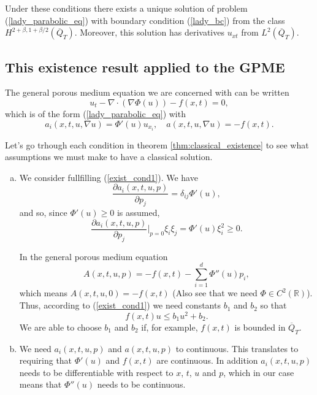 \documentclass[11pt, a4paper]{article}
\begin{document}
\begin{appendices}
\begin{theorem}
Under these conditions there exists a unique solution of problem (\ref{lady_parabolic_eq}) with boundary condition (\ref{lady_bc}) from the class $H^{2+\beta, 1+\beta/2}(\overline{Q}_T)$. Moreover, this solution has derivatives $u_{xt}$ from $L^2(\overline{Q}_T)$.
\end{theorem}
 
\subsection{This existence result applied to the GPME}
The general porous medium equation we are concerned with can be written
\begin{equation*}
u_t - \nabla \cdot (\nabla \Phi(u) ) - f(x,t) = 0,
\end{equation*}
which is of the form (\ref{lady_parabolic_eq}) with
\begin{equation}
a_i(x,t,u,\nabla u) = \Phi'(u) u_{x_i}, \quad a(x,t,u,\nabla u) = -f(x,t).
\end{equation}


Let's go trhough each condition in theorem \ref{thm:classical_existence} to see what assumptions we must make to have a classical solution.

\begin{enumerate}[a)]
	\item We consider fullfilling (\ref{exist_cond1}). We have
	\begin{equation*}
		\frac{\partial a_i(x,t,u,p)}{\partial p_j} = \delta_{ij} \Phi'(u),
	\end{equation*}
	and so, since $\Phi'(u) \geq 0$ is assumed,
	\begin{equation*}
		\frac{\partial a_i(x,t,u,p)}{\partial p_j}\Bigg|_{p=0}\xi_i\xi_j = \Phi'(u)\xi_i^2 \geq 0.
	\end{equation*}
	
	In the general porous medium equation
	\begin{equation*}
		A(x,t,u,p) = -f(x,t) - \sum_{i=1}^d \Phi''(u)p_i,
	\end{equation*}
	which means $A(x,t,u,0) = -f(x,t)$ (Also see that we need $\Phi \in C^2(\mathbb{R})$). Thus, according to (\ref{exist_cond1}) we need constants $b_1$ and $b_2$ so that
	\begin{equation*}
		f(x,t)u \leq b_1 u^2 + b_2.
	\end{equation*}
	We are able to choose $b_1$ and $b_2$ if, for example, $f(x,t)$ is bounded in $\overline{Q}_T$.
	
	\item We need $a_i(x,t,u,p)$ and $a(x,t,u,p)$ to continuous. This translates to requiring that $\Phi'(u)$ and $f(x,t)$ are continuous. In addition $a_i(x,t,u,p)$ needs to be differentiable with respect to $x$, $t$, $u$ and $p$, which in our case means that $\Phi''(u)$ needs to be continuous.
	

\end{enumerate}
\end{appendices}
\end{document}
